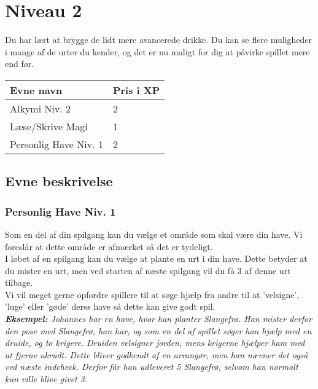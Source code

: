 \chapter*{Niveau 2}
Du har lært at brygge de lidt mere avancerede drikke. Du kan se flere muligheder i mange af de urter du kender, og det er nu muligt for dig at påvirke spillet mere end før.\\
\begin{table}[H]
    \centering
    \begin{tabular}{|p{}|p{}|}
    \rowcolor{cerulean!80}\hline
        Evne navn & Pris i XP \\\hline
         Alkymi Niv. 2 & 2 \\\hline
         Læse/Skrive Magi & 1 \\\hline
         Personlig Have Niv. 1 & 2 \\
         \hline
    \end{tabular}
\end{table}
\section*{Evne beskrivelse}





\subsection*{Personlig Have Niv. 1}
Som en del af din spilgang kan du vælge et område som skal være din have. Vi foreslår at dette område er afmærket så det er tydeligt.\\
I løbet af en spilgang kan du vælge at plante en urt i din have. Dette betyder at du mister en urt, men ved starten af næste spilgang vil du få 3 af denne urt tilbage.\\
Vi vil meget gerne opfordre spillere til at søge hjælp fra andre til at 'velsigne', 'luge' eller 'gøde' deres have så dette kan give godt spil.\\
\textit{\textbf{Eksempel:} Johannes har en have, hvor han planter Slangefrø. Han mister derfor den pose med Slangefrø, han har, og som en del af spillet søger han hjælp med en druide, og to krigere. Druiden velsigner jorden, mens krigerne hjælper ham med at fjerne ukrudt. Dette bliver godkendt af en arrangør, men han nævner det også ved næste indcheck. Derfor får han udleveret 5 Slangefrø, selvom han normalt kun ville blive givet 3.}
\\
